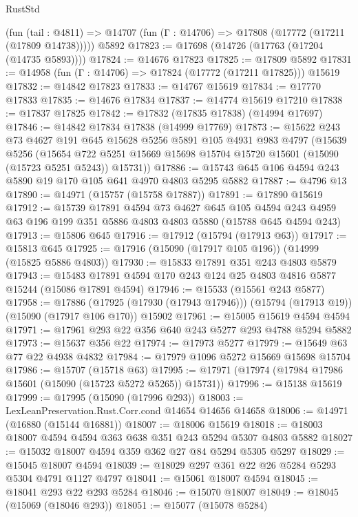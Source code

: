 \begin{lexlean}{RustStd}
\begin{coremodule}
    (fun (tail : @4811) => @14707 (fun (Γ : @14706) => @17808 (@17772 (@17211 (@17809 @14738)))))
    @5892
@17823 := @17698 (@14726 (@17763 (@17204 (@14735 @5893))))
@17824 := @14676 @17823
@17825 := @17809 @5892
@17831 := @14958 (fun (Γ : @14706) => @17824 (@17772 (@17211 @17825))) @15619
@17832 := @14842 @17823
@17833 := @14767 @15619
@17834 := @17770 @17833
@17835 := @14676 @17834
@17837 := @14774 @15619 @17210
@17838 := @17837 @17825
@17842 := @17832 (@17835 @17838) (@14994 @17697)
@17846 := @14842 @17834 @17838 (@14999 @17769)
@17873 := @15622
    @243
    @73
    @4627
    @191
    @645
    @15628
    @5256
    @5891
    @105
    @4931
    @983
    @4797
    (@15639
      @5256
      (@15654 @722 @5251 @15669 @15698 @15704 @15720 @15601 (@15090 (@15723 @5251 @5243)) @15731))
@17886 := @15743 @645 @106 @4594 @243 @5890 @19 @170 @105 @641 @4970 @4803 @5295 @5882
@17887 := @4796 @13
@17890 := @14971 (@15757 (@15758 @17887))
@17891 := @17890 @15619
@17912 := @15739
    @17891
    @4594
    @73
    @4627
    @645
    @105
    @4594
    @243
    @4959
    @63
    @196
    @199
    @351
    @5886
    @4803
    @4803
    @5880
    (@15788 @645 @4594 @243)
@17913 := @15806 @645
@17916 := @17912 (@15794 (@17913 @63))
@17917 := @15813 @645
@17925 := @17916 (@15090 (@17917 @105 @196)) (@14999 (@15825 @5886 @4803))
@17930 := @15833 @17891 @351 @243 @4803 @5879
@17943 := @15483 @17891 @4594 @170 @243 @124 @25 @4803 @4816 @5877 @15244 (@15086 @17891 @4594)
@17946 := @15533 (@15561 @243 @5877)
@17958 := @17886
    (@17925 (@17930 (@17943 @17946)))
    (@15794 (@17913 @19))
    (@15090 (@17917 @106 @170))
    @15902
@17961 := @15005 @15619 @4594 @4594
@17971 := @17961 @293 @22 @356 @640 @243 @5277 @293 @4788 @5294 @5882
@17973 := @15637 @356 @22
@17974 := @17973 @5277
@17979 := @15649 @63 @77 @22 @4938 @4832
@17984 := @17979 @1096 @5272 @15669 @15698 @15704
@17986 := @15707 (@15718 @63)
@17995 := @17971 (@17974 (@17984 @17986 @15601 (@15090 (@15723 @5272 @5265)) @15731))
@17996 := @15138 @15619
@17999 := @17995 (@15090 (@17996 @293))
@18003 := LexLeanPreservation.Rust.Corr.cond @14654 @14656 @14658
@18006 := @14971 (@16880 (@15144 @16881))
@18007 := @18006 @15619
@18018 := @18003 @18007 @4594 @4594 @363 @638 @351 @243 @5294 @5307 @4803 @5882
@18027 := @15032 @18007 @4594 @359 @362 @27 @84 @5294 @5305 @5297
@18029 := @15045 @18007 @4594
@18039 := @18029 @297 @361 @22 @26 @5284 @5293 @5304 @4791 @1127 @4797
@18041 := @15061 @18007 @4594
@18045 := @18041 @293 @22 @293 @5284
@18046 := @15070 @18007
@18049 := @18045 (@15069 (@18046 @293))
@18051 := @15077 (@15078 @5284)

\end{coremodule}
\end{lexlean}
